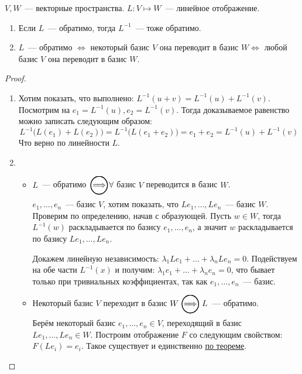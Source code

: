 \begin{statement}
    $V,W$~--- векторные пространства. $L: V\mapsto W$~--- линейное отображение.
    \begin{enumerate}
        \item Если $L$~--- обратимо, тогда $L^{-1}$~--- тоже обратимо.
        \item $L$~--- обратимо $\Leftrightarrow$ некоторый базис $V$ она переводит в базис $W\Leftrightarrow$ 
            любой базис $V$ она переводит в базис $W$.
    \end{enumerate}
\end{statement}
\begin{proof}\leavevmode
    \begin{enumerate}
        \item 
            Хотим показать, что выполнено: $L^{-1}(u + v) = L^{-1}(u) + L^{-1}(v)$. Посмотрим на 
            $e_1 = L^{-1}(u), e_2 = L^{-1}(v)$. Тогда доказываемое равенство можно записать следующим
            образом: 
            $$L^{-1}\big(L(e_1) + L(e_2)\big) = L^{-1}\big(L(e_1 + e_2)\big) = e_1 + e_2 =
            L^{-1}(u) + L^{-1}(v)$$
            Что верно по линейности $L$.
        \item
            \begin{itemize}
                \item
                    $L$~--- обратимо $\ora \forall$ базис $V$ переводится в базис $W$.

                    $e_1,\dots,e_n$~--- базис $V$, хотим показать, что $Le_1,\dots,Le_n$~--- базис $W$.
                    Проверим по определению, начав с образующей. Пусть $w\in W$, тогда
                    $L^{-1}(w)$ раскладывается по базису $e_1,\dots, e_n$, а значит $w$
                    раскладывается по базису $Le_1,\dots, Le_n$. 

                    Докажем линейную независимость: $\lambda_1Le_1 + \dots + \lambda_nLe_n=0$.
                    Подействуем на обе части $L^{-1}(x)$ и получим: $\lambda_1e_1+\dots+\lambda_ne_n=0$, 
                    что бывает только при тривиальных коэффициентах, так как $e_1,\dots,e_n$~--- базис.
                \item
                    Некоторый базис $V$ переходит в базис $W\ora L$~--- обратимо.

                    Берём некоторый базис $e_1,\dots,e_n \in V$, переходящий в базис 
                    $Le_1,\dots,Le_n \in W$. Построим отображение $F$ со следующим свойством:
                    $F(Le_i)=e_i$. Такое существует и единственно \hyperref[thm:О свойстве линейного отображения действующего на базис]
                    {по теореме}.


\end{itemize}
\end{enumerate}
\end{proof}
